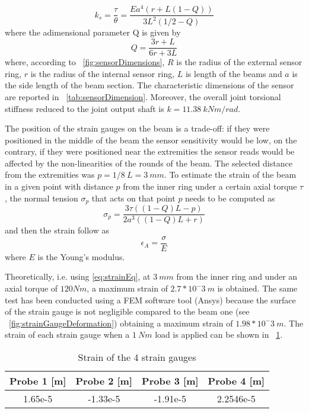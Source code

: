 \begin{equation}
\label{eqn:sensorStiffness}
k_{s} = \frac{\tau}{\theta} = \frac{Ea^4(r+L(1-Q))}{3L^2(1/2-Q)}	
\end{equation}
where the adimensional parameter Q is given by
\begin{equation}
\label{eqn:adimensionalQ}
Q = \frac{3r+L}{6r+3L}	
\end{equation}
where, according to \figurename \ \ref{fig:sensorDimensions}, $R$ is the radius of the external sensor ring, $r$ is the radius of the internal sensor ring, $L$ is length of the beams and $a$ is the side length of the beam section.
The characteristic dimensions of the sensor are reported in \tablename \ \ref{tab:sensorDimension}.
Moreover, the overall joint torsional stiffness reduced to the joint output shaft is $k = 11.38\ kNm/rad$.
\par The position of the strain gauges on the beam is a trade-off: if they were positioned in the middle of the beam the sensor sensitivity would be low, on the contrary, if they were positioned near the extremities the sensor reads would be affected by the non-linearities of the rounds of the beam. The selected distance from the extremities was $p = 1/8 \ L = 3 \ mm$.
To estimate the strain of the beam in a given point with distance $p$ from the inner ring under a certain axial torque $\tau$, the normal tension $\sigma_p$ that acts on that point $p$ needs to be computed as
\begin{equation}
\label{eqn:normalTensionOnBeam}
\sigma_p = \frac{3\tau((1-Q)L-p)}{2a^3((1-Q)L+r)}	
\end{equation}
and then the strain follow as 
\begin{equation}
\label{eq:strainEq}
\epsilon_A= \frac{\sigma}{E}
\end{equation} 
where $E$ is the Young's modulus.
\par Theoretically, i.e. using \eqref{eq:strainEq}, at $3 \ mm$ from the inner ring and under an axial torque of $120 Nm$,  a maximum strain of $2.7*10^-3 \ m$ is obtained.
The same test has been conducted using a FEM software tool (Ansys\textregistered) because the surface of the strain gauge is not negligible compared to the beam one (see \figurename \ \ref{fig:strainGaugeDeformation}) obtaining a maximum strain of $1.98*10^-3 \ m$.
The strain of each strain gauge when a $1 \ Nm$ load is applied can be shown in \tablename \ \ref{tab:sensorStrain}.
\begin{table}[]
	\renewcommand{\arraystretch}{1.3}
	\caption{Strain of the 4 strain gauges}
	\label{tab:sensorStrain}
	\centering
	\begin{tabular}{c c c c}
		\hline \hline
		\bfseries Probe 1 [m] & \bfseries Probe 2 [m] & \bfseries Probe 3 [m] & \bfseries Probe 4 [m]\\
		\hline
		1.65e-5  & -1.33e-5 & -1.91e-5 & 2.2546e-5\\
		\hline \hline
	\end{tabular}
\end{table} 
